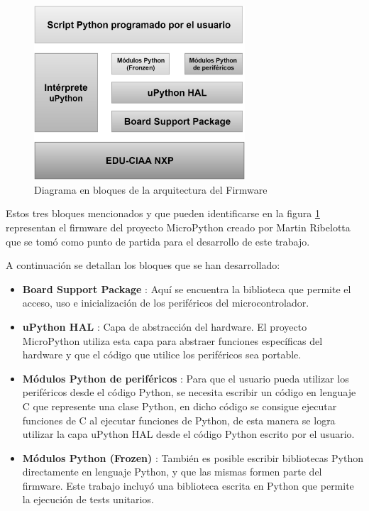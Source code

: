 \begin{figure}[ht]
  \centering
    \includegraphics[width=0.7\textwidth]{Figures/fig_firm_arquitectura}
  \caption{Diagrama en bloques de la arquitectura del Firmware}
  \label{fig:firmwareArq}
\end{figure}

Estos tres bloques mencionados y que pueden identificarse en la figura \ref{fig:firmwareArq} representan el firmware del proyecto MicroPython creado por Martin Ribelotta que se tomó como punto de partida para el desarrollo de este trabajo. 

A continuación se detallan los bloques que se han desarrollado:

\begin{itemize}
	\item \textbf{Board Support Package} : Aquí se encuentra la biblioteca que permite el acceso, uso e inicialización de los periféricos del microcontrolador.
	\item \textbf{uPython HAL} : Capa de abstracción del hardware. El proyecto MicroPython utiliza esta capa para abstraer funciones específicas del hardware y que el código que utilice los periféricos sea portable.
	\item \textbf{Módulos Python de periféricos} : Para que el usuario pueda utilizar los periféricos desde el código Python, se necesita escribir un código en lenguaje C que represente una clase Python, en dicho código se consigue ejecutar funciones de C al ejecutar funciones de Python, de esta manera se logra utilizar la capa uPython HAL desde el código Python escrito por el usuario.
	\item \textbf{Módulos Python (Frozen)} : También es posible escribir bibliotecas Python directamente en lenguaje Python, y que las mismas formen parte del firmware. Este trabajo incluyó una biblioteca escrita en Python que permite la ejecución de tests unitarios.
\end{itemize}

